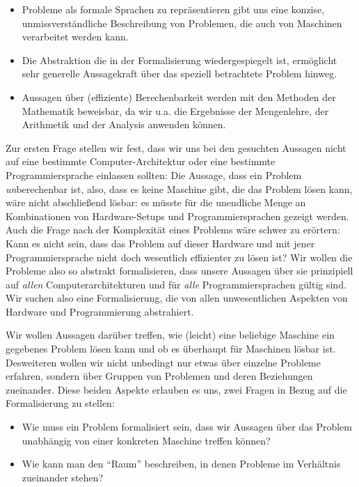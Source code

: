 \begin{itemize}
    \item Probleme als formale Sprachen zu repräsentieren gibt uns eine
        konzise, unmissverständliche Beschreibung von Problemen,
        die auch von Maschinen verarbeitet werden kann. 
    \item Die Abstraktion die in der Formalisierung wiedergespiegelt ist,
        ermöglicht sehr generelle Aussagekraft über das speziell betrachtete Problem hinweg.
    \item Aussagen über (effiziente) Berechenbarkeit werden mit den Methoden der Mathematik
        beweisbar, da wir u.a. die Ergebnisse der Mengenlehre, der Arithmetik
        und der Analysis anwenden können.
\end{itemize}

Zur ersten Frage stellen wir fest,
dass wir uns bei den gesuchten Aussagen nicht auf eine bestimmte Computer-Architektur
oder eine bestimmte Programmiersprache einlassen sollten:
Die Aussage, dass ein Problem \emph{un}berechenbar ist,
also, dass es keine Maschine gibt, die das Problem lösen kann,
wäre nicht abschließend lösbar:
es müsste für die unendliche Menge an Kombinationen von Hardware-Setups und Programmiersprachen
gezeigt werden.
Auch die Frage nach der Komplexität eines Problems wäre schwer zu erörtern:
Kann es nicht sein, dass das Problem auf dieser Hardware
und mit jener Programmiersprache nicht doch wesentlich effizienter zu lösen ist?
Wir wollen die Probleme also so abstrakt formalisieren,
dass unsere Aussagen über sie prinzipiell auf \emph{allen} Computerarchitekturen
und für \emph{alle} Programmiersprachen gültig sind.
Wir suchen also eine Formalisierung,
die von allen unwesentlichen Aspekten von Hardware und Programmierung abstrahiert.


Wir wollen Aussagen darüber treffen,
wie (leicht) eine beliebige Maschine ein gegebenes Problem lösen kann
und ob es überhaupt für Maschinen lösbar ist.
Desweiteren wollen wir nicht unbedingt nur etwas über einzelne Probleme erfahren,
sondern über Gruppen von Problemen und deren Beziehungen zueinander.
Diese beiden Aspekte erlauben es uns,
zwei Fragen in Bezug auf die Formalisierung zu stellen:
\begin{itemize}
\item Wie muss ein Problem formalisiert sein,
      dass wir Aussagen über das Problem unabhängig von einer konkreten Maschine treffen können?
\item Wie kann man den ``Raum'' beschreiben, in denen Probleme im Verhältnis zueinander stehen?
\end{itemize}


